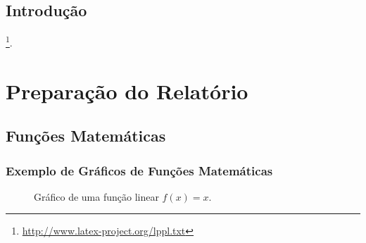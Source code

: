 \documentclass[
	12pt,				%
    oneside,            %
	a4paper,			%
	english,			%
	brazilian,		    %
	]{AcademicoUFT}
\begin{document}
\tableofcontents*
\cleardoublepage


\textual


\chapter*[Introdução]{Introdução}

\lipsum[1] \footnote{\url{http://www.latex-project.org/lppl.txt}}.


\part{Preparação do Relatório}


\chapter{Funções Matemáticas}

\section{Exemplo de Gráficos de Funções Matemáticas}

\lipsum[1] %
\cite{talbot2012}


\begin{figure}[H]
    \centering
    \caption{Gráfico de uma função linear $f(x)=x$.}
    \label{fig:funcao_linear}
\end{figure}
\end{document}
